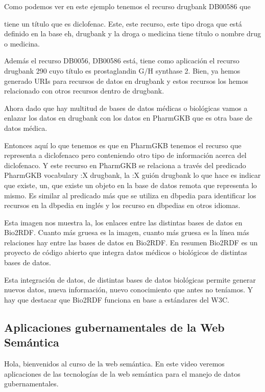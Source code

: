 Como podemos ver en este ejemplo tenemos el recurso drugbank DB00586 que

tiene un título que es diclofenac. Este, este recurso, este tipo droga que está definido en la base eh, drugbank y la droga o medicina tiene título o nombre drug o medicina.

Además el recurso DB0056, DB00586 está, tiene como aplicación el recurso drugbank 290 cuyo título es prostaglandin G/H synthase 2. Bien, ya hemos generado URIs para recursos de datos en drugbank y estos recursos los hemos relacionado con otros recursos dentro de drugbank.

Ahora dado que hay multitud de bases de datos médicas o biológicas vamos a enlazar los datos en drugbank con los datos en PharmGKB que es otra base de datos médica.

Entonces aquí lo que tenemos es que en PharmGKB tenemos el recurso que representa a diclofenaco pero conteniendo otro tipo de información acerca del diclofenaco. Y este recurso en PharmGKB se relaciona a través del predicado PharmGKB vocabulary :X drugbank, la :X guión drugbank lo que hace es indicar que existe, un, que existe un objeto en la base de datos remota que representa lo mismo. Es similar al predicado más que se utiliza en dbpedia para identificar los recursos en la dbpedia en inglés y los recurso en dbpedias en otros idiomas.

Esta imagen nos muestra la, los enlaces entre las distintas bases de datos en Bio2RDF. Cuanto más gruesa es la imagen, cuanto más gruesa es la línea más relaciones hay entre las bases de datos en Bio2RDF. En resumen Bio2RDF es un proyecto de código abierto que integra datos médicos o biológicos de distintas bases de datos.

Esta integración de datos, de distintas bases de datos biológicas permite generar nuevos datos, nueva información, nuevo conocimiento que antes no teníamos. Y hay que destacar que Bio2RDF funciona en base a estándares del W3C.

\subsection{Aplicaciones gubernamentales de la Web Semántica}

Hola, bienvenidos al curso de la web semántica. En este video veremos aplicaciones de las tecnologías de la web semántica para el manejo de datos gubernamentales.

